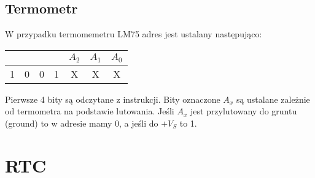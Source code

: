 \documentclass[11pt]{article}
\begin{document}
\subsection{Termometr}
W przypadku termomemetru LM75 adres jest ustalany następująco:
\begin{center}
    \begin{tabular}{|c|c|c|c|c|c|c|}
        \hline
         & & & & $A_2$ & $A_1$ & $A_0$\\
        \hline
        1& 0& 0& 1& X & X & X\\
        \hline
    \end{tabular}
\end{center}
Pierwsze 4 bity są odczytane z instrukcji. Bity oznaczone $A_x$ są ustalane
zależnie od termometra na podstawie lutowania. Jeśli $A_x$ jest przylutowany
do gruntu (ground) to w adresie mamy 0, a jeśli do $+V_S$ to 1.
\section{RTC}
\end{document}
